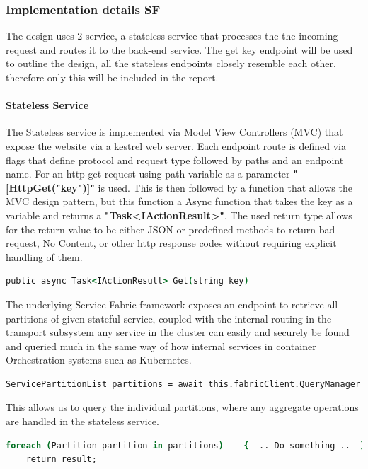\documentclass[a4paper,10pt,titlepage]{report}
\begin{document}
\subsubsection{Implementation details SF}

The design uses 2 service, a  stateless service that processes the the incoming request and routes it to the back-end service. The get key endpoint will be used to outline the design,  all the stateless endpoints closely resemble each other, therefore only this will be included in the report.\\
        
\paragraph{Stateless Service}
The Stateless service is implemented via Model View Controllers (MVC) that expose the website via a kestrel web server. Each endpoint route is defined via flags that define protocol and request type followed by paths and an endpoint name. For an http get request using path variable as a parameter \textbf{"[HttpGet("{key}")]"} is used. This is then followed by a function that allows the MVC design pattern, but this function a Async function that takes the key as a variable and returns a \textbf{"Task<IActionResult>"}. The used return type allows for the return value to be either JSON or predefined methods to return bad request, No Content, or other http response codes without requiring explicit handling of them.
\begin{lstlisting}[language=csh]
public async Task<IActionResult> Get(string key)
\end{lstlisting}   

The underlying Service Fabric framework exposes an endpoint to retrieve all partitions of given stateful service, coupled with the internal routing in the transport subsystem any service in the cluster can easily and securely be found and queried much in the same way of how internal services in container Orchestration systems such as Kubernetes. 
\begin{lstlisting}[language=csh]
    ServicePartitionList partitions = await this.fabricClient.QueryManager.GetPartitionListAsync(serviceName);
\end{lstlisting}   
This allows us to query the individual partitions, where any aggregate operations are handled in the stateless service.
\begin{lstlisting}[language=csh]
    foreach (Partition partition in partitions)    {  .. Do something ..  }
    return result;
\end{lstlisting}  
\end{document}
